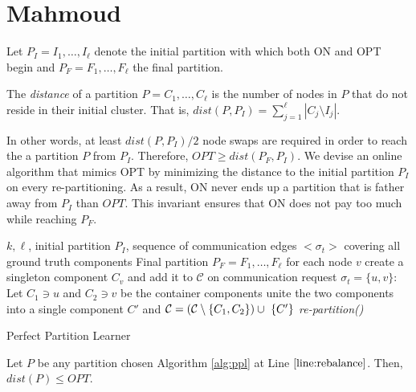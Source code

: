 \section{Mahmoud}

Let $P_I = I_1, \dots, I_{\ell}$ denote the initial partition with which both ON and OPT begin and
$P_F = F_1, \dots, F_{\ell}$ the final partition.
\begin{definition}	\label{def:dist}
	The \emph{distance} of a partition $P = C_1, \dots, C_{\ell}$ is the number of nodes in $P$ that do not reside in their initial cluster.
	That is,
	$dist(P, P_I) = \sum_{j=1}^{\ell} | C_j \setminus I_j |$. 
\end{definition}

In other words,
at least $dist(P, P_I)/2$ node swaps are required in order to reach the a partition $P$ from $P_I$.
Therefore,
$OPT \geq dist(P_F, P_I) $.
We devise an online algorithm that mimics OPT by minimizing the distance to the initial partition $P_I$ on every re-partitioning.
As a result,
ON never ends up a partition that is father away from $P_I$ than $OPT$.
This invariant ensures that ON does not pay too much while reaching $P_F$.

\begin{algorithm}
	\renewcommand{\algorithmicrequire}{\textbf{Input:}}
	\renewcommand{\algorithmicensure}{\textbf{Output:}}
	\begin{algorithmic}[1]
		\Require 
		$k, \ell$,
		initial partition $P_I$,
		sequence of communication edges $<\sigma_t>$ covering all ground truth components
		\Ensure Final partition $P_F = F_1, \dots, F_{\ell}$ 
		\State for each node $v$ create a singleton component $C_v$ and add it to $\mathcal{C}$ \label{line:initcomponents}
		\State on communication request $\sigma_t=\{u,v\}$:
		\State Let $C_1 \ni u$ and $C_2 \ni v$ be the container components
		\State unite the two components into a single component $C'$ and
		$\mathcal{C} = (\mathcal{C}\setminus\{C_1, C_2\}) \cup ~\{C'\}$ \label{line:mergecomponents}
		\State \textit{re-partition()} \label{line:rebalance} 
		\EndIf
		\EndIf
	\end{algorithmic}
	\caption{Perfect Partition Learner}
	\label{alg:ppl}
\end{algorithm}

\begin{property} \label{prop:dist<OPT}
	Let $P$ be any partition chosen Algorithm \ref{alg:ppl} at Line $\ref{line:rebalance}$.
	Then, $dist(P) \leq OPT$.
\end{property}

